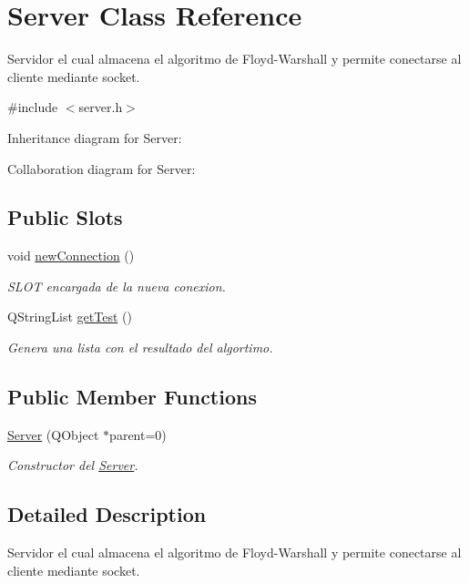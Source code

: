 \hypertarget{classServer}{}\section{Server Class Reference}
\label{classServer}


Servidor el cual almacena el algoritmo de Floyd-\/\+Warshall y permite conectarse al cliente mediante socket.  




{\ttfamily \#include $<$server.\+h$>$}



Inheritance diagram for Server\+:


Collaboration diagram for Server\+:
\subsection*{Public Slots}
\begin{DoxyCompactItemize}
\item 
void \hyperlink{classServer_a4caf81e22e3a0535dd5955b422b897f0}{new\+Connection} ()
\begin{DoxyCompactList}\small\item\em S\+L\+OT encargada de la nueva conexion. \end{DoxyCompactList}\item 
Q\+String\+List \hyperlink{classServer_a257377ec86bcf1986bd5187ce99f3258}{get\+Test} ()
\begin{DoxyCompactList}\small\item\em Genera una lista con el resultado del algortimo. \end{DoxyCompactList}\end{DoxyCompactItemize}
\subsection*{Public Member Functions}
\begin{DoxyCompactItemize}
\item 
\hyperlink{classServer_a1950ac036d86af898428d7ba39bbf048}{Server} (Q\+Object $\ast$parent=0)
\begin{DoxyCompactList}\small\item\em Constructor del \hyperlink{classServer}{Server}. \end{DoxyCompactList}\end{DoxyCompactItemize}


\subsection{Detailed Description}
Servidor el cual almacena el algoritmo de Floyd-\/\+Warshall y permite conectarse al cliente mediante socket. 

